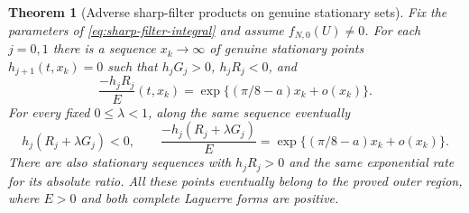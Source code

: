 \documentclass[11pt]{article}
\numberwithin{equation}{section}
\newtheorem{theorem}{Theorem}[section]
\theoremstyle{definition}
\theoremstyle{remark}
\begin{document}
\begin{theorem}[Adverse sharp-filter products on genuine stationary sets]
\label{thm:sharp-filter-obstruction}
Fix the parameters of \eqref{eq:sharp-filter-integral} and assume
$f_{N,0}(U)\ne0$. For each $j=0,1$ there is a sequence
$x_k\to\infty$ of genuine stationary points $h_{j+1}(t,x_k)=0$ such
that $h_jG_j>0$, $h_jR_j<0$, and
\begin{equation}
 \frac{-h_jR_j}{E}(t,x_k)
   =\exp\{(\pi/8-a)x_k+o(x_k)\}.
 \label{eq:sharp-filter-adverse-rate}
\end{equation}
For every fixed $0\le\lambda<1$, along the same sequence eventually
\begin{equation}
 h_j(R_j+\lambda G_j)<0,\qquad
 \frac{-h_j(R_j+\lambda G_j)}E
   =\exp\{(\pi/8-a)x_k+o(x_k)\}.
 \label{eq:sharp-filter-absorption-rate}
\end{equation}
There are also stationary sequences with $h_jR_j>0$ and the same
exponential rate for its absolute ratio. All these points eventually
belong to the proved outer region, where $E>0$ and both complete
Laguerre forms are positive.
\end{theorem}
\end{document}
